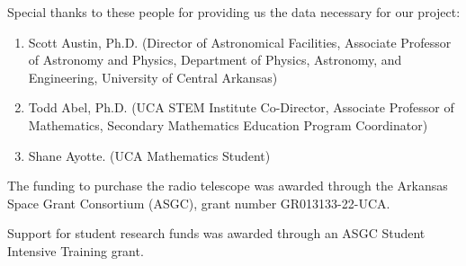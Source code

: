 \noindent Special thanks to these people for providing us the data necessary for our project:

\begin{enumerate}
    \item Scott Austin, Ph.D. (Director of Astronomical Facilities, Associate Professor of Astronomy and Physics, Department of Physics, Astronomy, and Engineering, University of Central Arkansas) 
    \item Todd Abel, Ph.D. (UCA STEM Institute Co-Director, Associate Professor of Mathematics, Secondary Mathematics Education Program Coordinator)
    \item Shane Ayotte. (UCA Mathematics Student)
\end{enumerate}

The funding to purchase the radio telescope was awarded through the Arkansas Space Grant Consortium (ASGC), grant number GR013133-22-UCA.

Support for student research funds was awarded through an ASGC Student Intensive Training grant.
